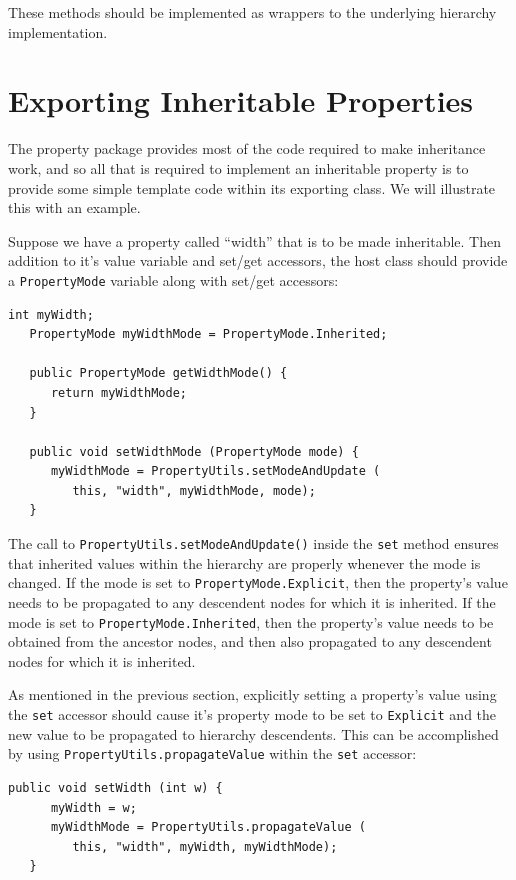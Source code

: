 These methods should be implemented as wrappers to the underlying
hierarchy implementation.

\section{Exporting Inheritable Properties}

The property package provides most of the code required to make
inheritance work, and so all that is required to implement an
inheritable property is to provide some simple template code within
its exporting class. We will illustrate this with an example.

Suppose we have a property called ``width'' that is to be made
inheritable.  Then addition to it's value variable and set/get
accessors, the host class should provide a {\tt PropertyMode} variable
along with set/get accessors:
\begin{lstlisting}[]
   int myWidth;
   PropertyMode myWidthMode = PropertyMode.Inherited;
   
   public PropertyMode getWidthMode() {
      return myWidthMode;
   }

   public void setWidthMode (PropertyMode mode) {
      myWidthMode = PropertyUtils.setModeAndUpdate (
         this, "width", myWidthMode, mode);
   }
\end{lstlisting}
The call to {\tt PropertyUtils.setModeAndUpdate()} inside the 
{\tt set} method ensures that inherited values within the hierarchy are
properly whenever the mode is changed. If the mode is set to 
{\tt PropertyMode.Explicit}, then the property's value needs to be
propagated to any descendent nodes for which it is inherited.  If the
mode is set to {\tt PropertyMode.Inherited}, then the property's value
needs to be obtained from the ancestor nodes, and then also propagated
to any descendent nodes for which it is inherited.

As mentioned in the previous section, explicitly setting a property's
value using the {\tt set} accessor should cause it's property mode to
be set to {\tt Explicit} and the new value to be propagated to
hierarchy descendents.  This can be accomplished by using 
{\tt PropertyUtils.propagateValue} within the {\tt set} accessor:
\begin{lstlisting}[]
   public void setWidth (int w) {
      myWidth = w;
      myWidthMode = PropertyUtils.propagateValue (
         this, "width", myWidth, myWidthMode);
   }     
\end{lstlisting}

